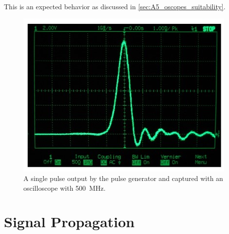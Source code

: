     This is an expected behavior as discussed in \cref{sec:A5_oscopes_suitability}.
    \begin{figure}[H]
        \centering
        \includegraphics[width=.4\textwidth]{messdaten/500mhz_waveform.jpg}
        \caption[Pulse captured with a \SI{500}{MHz} oscilloscope]{A single pulse output by the pulse generator and captured with an oscilloscope with \SI{500}{MHz}.}
        \label{fig:500MHz_waveform}
    \end{figure}
\section{Signal Propagation}
%
